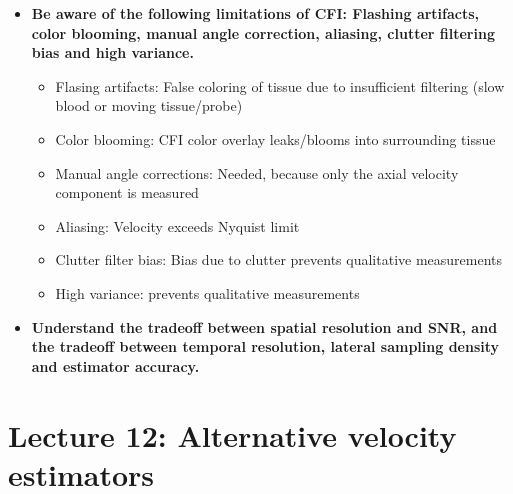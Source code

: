 \documentclass[10pt,a4paper,noendnumber=true]{scrartcl}
\begin{document}
\begin{itemize}
\item \textbf{Be aware of the following limitations of CFI: Flashing artifacts, color blooming, manual angle correction, aliasing, clutter filtering bias and high variance.}
\begin{itemize}
\item Flasing artifacts: False coloring of tissue due to insufficient filtering (slow blood or moving tissue/probe)
\item Color blooming: CFI color overlay leaks/blooms into surrounding tissue
\item Manual angle corrections: Needed, because only the axial velocity component is measured
\item Aliasing: Velocity exceeds Nyquist limit
\item Clutter filter bias: Bias due to clutter prevents qualitative measurements
\item High variance: prevents qualitative measurements
\end{itemize}


\item \textbf{Understand the tradeoff between spatial resolution and SNR, and the tradeoff between temporal resolution, lateral sampling density and estimator accuracy.}


\end{itemize}


\newpage
\section{Lecture 12: Alternative velocity estimators}
\end{document}
